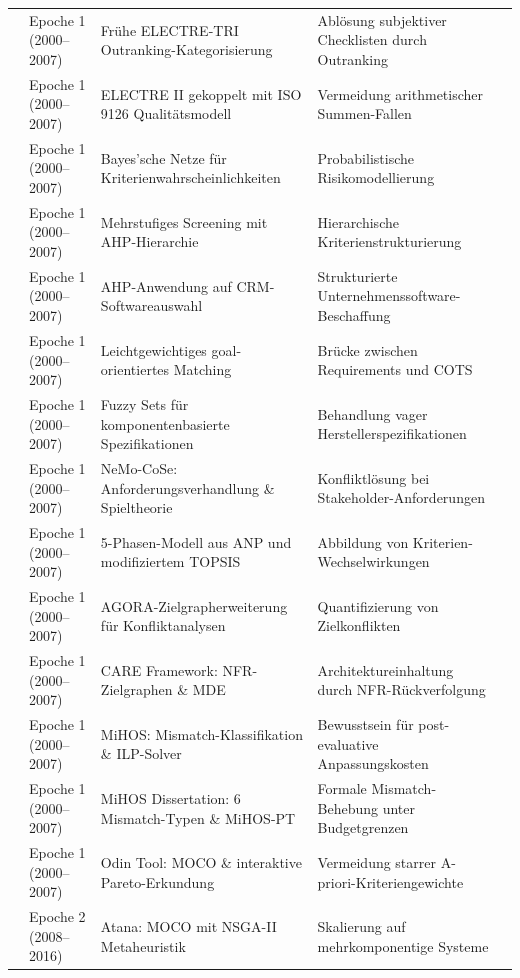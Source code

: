 \begin{longtable}{p{} p{} p{} p{} p{}}
\cite{LZQJ6M4X} & Epoche 1 (2000--2007) & Frühe ELECTRE-TRI Outranking-Kategorisierung & Ablösung subjektiver Checklisten durch Outranking \\
\cite{M3B2D3GD} & Epoche 1 (2000--2007) & ELECTRE II gekoppelt mit ISO 9126 Qualitätsmodell & Vermeidung arithmetischer Summen-Fallen \\
\cite{QDUNCXFC} & Epoche 1 (2000--2007) & Bayes'sche Netze für Kriterienwahrscheinlichkeiten & Probabilistische Risikomodellierung \\
\cite{FCYW9EWJ} & Epoche 1 (2000--2007) & Mehrstufiges Screening mit AHP-Hierarchie & Hierarchische Kriterienstrukturierung \\
\cite{DAU8NSK8} & Epoche 1 (2000--2007) & AHP-Anwendung auf CRM-Softwareauswahl & Strukturierte Unternehmenssoftware-Beschaffung \\
\cite{TLB687YL} & Epoche 1 (2000--2007) & Leichtgewichtiges goal-orientiertes Matching & Brücke zwischen Requirements und COTS \\
\cite{CI86GRRG} & Epoche 1 (2000--2007) & Fuzzy Sets für komponentenbasierte Spezifikationen & Behandlung vager Herstellerspezifikationen \\
\cite{CZZ6XQZJ} & Epoche 1 (2000--2007) & NeMo-CoSe: Anforderungsverhandlung \& Spieltheorie & Konfliktlösung bei Stakeholder-Anforderungen \\
\cite{U5JPV4SF} & Epoche 1 (2000--2007) & 5-Phasen-Modell aus ANP und modifiziertem TOPSIS & Abbildung von Kriterien-Wechselwirkungen \\
\cite{8XNYS4M9} & Epoche 1 (2000--2007) & AGORA-Zielgrapherweiterung für Konfliktanalysen & Quantifizierung von Zielkonflikten \\
\cite{6RNULWVY} & Epoche 1 (2000--2007) & CARE Framework: NFR-Zielgraphen \& MDE & Architektureinhaltung durch NFR-Rückverfolgung \\
\cite{MC9UMXZZ} & Epoche 1 (2000--2007) & MiHOS: Mismatch-Klassifikation \& ILP-Solver & Bewusstsein für post-evaluative Anpassungskosten \\
\cite{9F79VAAB} & Epoche 1 (2000--2007) & MiHOS Dissertation: 6 Mismatch-Typen \& MiHOS-PT & Formale Mismatch-Behebung unter Budgetgrenzen \\
\cite{ZQMG69VT} & Epoche 1 (2000--2007) & Odin Tool: MOCO \& interaktive Pareto-Erkundung & Vermeidung starrer A-priori-Kriteriengewichte \\
\cite{MZ8JHDYA} & Epoche 2 (2008--2016) & Atana: MOCO mit NSGA-II Metaheuristik & Skalierung auf mehrkomponentige Systeme \\

\end{longtable}
